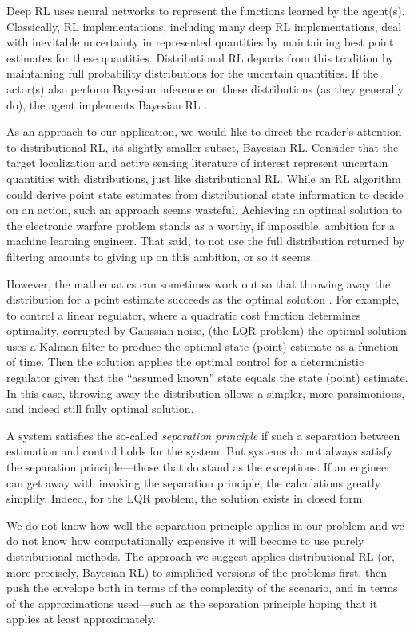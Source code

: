 \documentclass{article}
\begin{document}
Deep RL \cite{li2017deep} uses neural networks to represent the
functions learned by the agent(s).  Classically, RL implementations,
including many deep RL implementations, deal with inevitable
uncertainty in represented quantities by maintaining best point
estimates for these quantities.  Distributional RL
\cite{osband2018randomized} departs from this tradition by maintaining
full probability distributions for the uncertain quantities. If the
actor(s) also perform Bayesian inference on these distributions (as
they generally do), the agent implements Bayesian RL
\cite{ghavamzadeh2016bayesian}.

As an approach to our application, we would like to direct the
reader's attention to distributional RL, its slightly smaller subset,
Bayesian RL.  Consider that the target localization and active sensing
literature of interest represent uncertain quantities with
distributions, just like distributional RL.  While an RL algorithm
could derive point state estimates from distributional state
information to decide on an action, such an approach seems wasteful.
Achieving an optimal solution to the electronic warfare problem stands
as a worthy, if impossible, ambition for a machine learning engineer.
That said, to not use the full distribution returned by filtering
amounts to giving up on this ambition, or so it seems.

However, the mathematics can sometimes work out so that throwing away
the distribution for a point estimate succeeds as the optimal solution
\cite{aastrom2012introduction}.  For example, to control a linear
regulator, where a quadratic cost function determines optimality,
corrupted by Gaussian noise, (the LQR problem) the optimal solution
uses a Kalman filter to produce the optimal state (point) estimate as
a function of time.  Then the solution applies the optimal control for
a deterministic regulator given that the ``assumed known'' state
equals the state (point) estimate.  In this case, throwing away the
distribution allows a simpler, more parsimonious, and indeed still
fully optimal solution.

A system satisfies the so-called \emph{separation principle} if such a
separation between estimation and control holds for the system.  But
systems do not always satisfy the separation principle---those that do
stand as the exceptions.  If an engineer can get away with invoking
the separation principle, the calculations greatly simplify.  Indeed,
for the LQR problem, the solution exists in closed form.

We do not know how well the separation principle applies in our
problem and we do not know how computationally expensive it will
become to use purely distributional methods.  The approach we suggest
applies distributional RL (or, more precisely, Bayesian RL) to
simplified versions of the problems first, then push the envelope both
in terms of the complexity of the scenario, and in terms of the
approximations used---such as the separation principle hoping that it
applies at least approximately.
\end{document}
